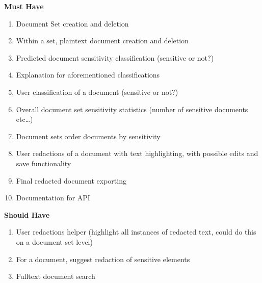 \documentclass{l4proj}
\begin{document}
\begin{minipage}[t]{.5\linewidth}
    \centerline{\textbf{Must Have}}
    \begin{enumerate}[label=\textbf{M\arabic*}]
        \item Document Set creation and deletion
        \item Within a set, plaintext document creation and deletion
        \item Predicted document sensitivity classification (sensitive or not?)
        \item Explanation for aforementioned classifications
        \item User classification of a document (sensitive or not?)
        \item Overall document set sensitivity statistics (number of sensitive documents etc…)
        \item Document sets order documents by sensitivity
        \item User redactions of a document with text highlighting, with possible edits and save functionality
        \item Final redacted document exporting
        \item Documentation for API
    \end{enumerate}
\end{minipage}
\hfill
\noindent
\begin{minipage}[t]{.5\linewidth}
    \centerline{\textbf{Should Have}}
    \begin{enumerate}[label=\textbf{S\arabic*}]
        \item User redactions helper (highlight all instances of redacted text, could do this on a document set level)
        \item For a document, suggest redaction of sensitive elements
        \item Fulltext document search
    \end{enumerate}
\end{minipage}

\vspace{0.5cm}
\end{document}
